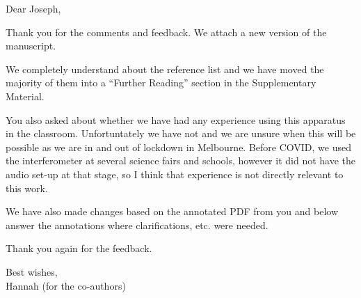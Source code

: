 \documentclass[a4paper, 10pt]{letter}
\begin{document}
Dear Joseph, 

Thank you for the comments and feedback. 
We attach a new version of the manuscript.

We completely understand about the reference list and we have moved the majority of them into a ``Further Reading'' section in the Supplementary Material. 

You also asked about whether we have had any experience using this apparatus in the classroom. Unfortuntately we have not and we are unsure when this will be possible as we are in and out of lockdown in Melbourne. Before COVID, we used the interferometer at several science fairs and schools, however it did not have the audio set-up at that stage, so I think that experience is not directly relevant to this work. 

We have also made changes based on the annotated PDF from you and below answer the annotations where clarifications, etc. were needed. 

Thank you again for the feedback. 

Best wishes, \\
Hannah (for the co-authors)
 
\end{document}
